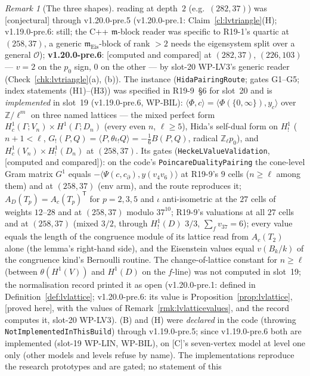 \documentclass[11pt]{article}
\theoremstyle{remark}
\newtheorem{remark}[theorem]{Remark}
\newcommand{\Z}{\mathbb{Z}}
\newcommand{\Ga}{\Gamma}
\newcommand{\m}{\mathfrak{m}}
\newcommand{\PROVED}{\textsf{[proved here]}}
\newcommand{\CONJ}{\textsf{[conjectural]}}
\newcommand{\CMPD}{\textsf{[computed and compared]}}   %
\begin{document}
\begin{remark}[The three shapes]
reading at depth~$2$ (e.g.\ $(282,37)$) was \CONJ{} through v1.20.0-pre.5 (v1.20.0-pre.1: Claim~\ref{cl:lvtriangle}(H); v1.19.0-pre.6: still; the C++ $\m$-block reader was specific to R19-1's quartic at $(258,37)$, a generic $\m_{\mathrm{Eis}}$-block of
rank $>2$ needs the eigensystem split over a general $\mathcal O$); \textbf{v1.20.0-pre.6}: \CMPD{} at $(282,37)$, $(226,103)$ --- $v=2$ on the $p_0$ sign, $0$ on the other --- by slot-20 WP-LV3's
generic reader (Check~\ref{chk:lvtriangle}(a), (b)). The instance (\texttt{HidaPairingRoute}; gates G1--G5; index statements (H1)--(H3)) was specified in R19-9~\S6 for
slot~20 and is \emph{implemented} in slot~19 (v1.19.0-pre.6, WP-BIL): $\langle\Phi,c\rangle=\langle\Phi(\{0,\infty\}),y_c\rangle$ over $\Z/\ell^{m}$ on three named lattices --- the mixed
perfect form $H^{1}_c(\Ga;V_n)\times H^{1}(\Ga;D_n)$ (every even $n$, $\ell\ge5$), Hida's self-dual form on $H^{1}_{!}$ ($n+1<\ell$, $G_{!}(P,Q)=\langle P,\theta\iota_{!}Q\rangle=-\tfrac16B(P,Q)$,
radical $\Z_\ell p_0$), and $H^{1}_c(V_n)\times H^{1}_{!}(D_n)$ at $(258,37)$. Its gates (\texttt{HeckeLValueValidation}, \CMPD): on the code's \texttt{PoincareDualityPairing} the cone-level
Gram matrix $G^{1}$ equals $-\langle\Psi(c,c_\partial),y(v_4v_6)\rangle$ at R19-9's $9$ cells ($n\ge\ell$ among them) and at $(258,37)$ (env arm), and the route reproduces it;
$A_D(T_p)=A_c(T_p)^{\mathsf T}$ for $p=2,3,5$ and $\iota$ anti-isometric at the $27$ cells of weights $12$--$28$ and at $(258,37)$ modulo $37^{10}$; R19-9's valuations at all $27$ cells and at
$(258,37)$ (mixed $3/2$, through $H^{1}_{!}(D)$ $3/3$, $\sum_fv_{37}=6$); every value equals the length of the congruence module of its lattice read from $A_c(T_2)$ alone (the
lemma's right-hand side), and the Eisenstein values equal $v(B_k/k)$ of the \textsf{congruence} kind's Bernoulli routine. The change-of-lattice constant for $n\ge\ell$ (between
$\theta(H^{1}(V))$ and $H^{1}(D)$ on the $f$-line) was not computed in slot~19; the normalisation record printed it as open (v1.20.0-pre.1: defined in Definition~\ref{def:lvlattice}; v1.20.0-pre.6:
its value is Proposition~\ref{prop:lvlattice}, \PROVED, with the values of Remark~\ref{rmk:lvlatticevalues}, and the record computes it, slot-20 WP-LV3).
(B) and (H) were \emph{declared} in the code (throwing \texttt{NotImplementedInThisBuild}) through v1.19.0-pre.5; since v1.19.0-pre.6 both are implemented (slot-19 WP-LIN, WP-BIL), on
[C]'s seven-vertex model at level one only (other models and levels refuse by name). The implementations reproduce the research prototypes and are gated; no statement of this

\end{remark}
\end{document}
